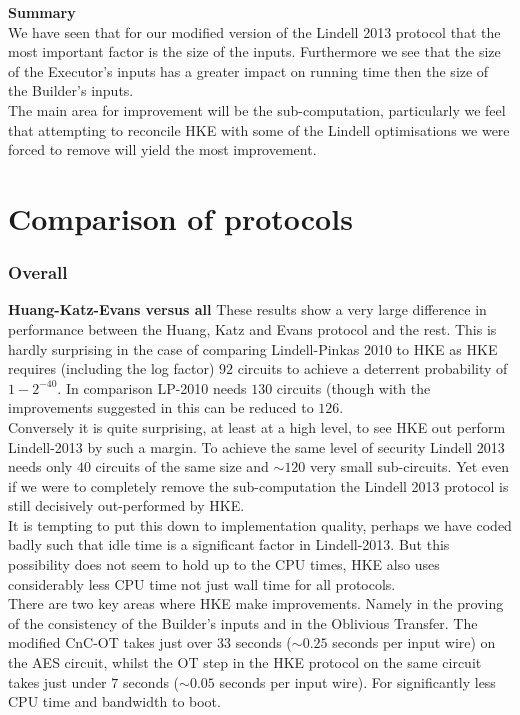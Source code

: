 \documentclass[ %
                    author={Nicholas Tutte},
                supervisor={Prof. Nigel Smart},
                    degree={MEng},
                     title={Secure Two Party Computation},
                  subtitle={A practical comparison of recent protocols},
                      type={Research - GG1K},
                      year={2015} ]{dissertation}
\begin{document}
				\noindent \textbf{Summary}\\
					We have seen that for our modified version of the Lindell 2013 protocol that the most important factor is the size of the inputs. Furthermore we see that the size of the Executor's inputs has a greater impact on running time then the size of the Builder's inputs.\\

					The main area for improvement will be the sub-computation, particularly we feel that attempting to reconcile HKE with some of the Lindell optimisations we were forced to remove will yield the most improvement.

			\FloatBarrier
			\section{Comparison of protocols}
				\subsubsection{Overall}

					\noindent \textbf{Huang-Katz-Evans versus all} These results show a very large difference in performance between the Huang, Katz and Evans protocol and the rest. This is hardly surprising in the case of comparing Lindell-Pinkas 2010 to HKE as HKE requires (including the log factor) $92$ circuits to achieve a deterrent probability of $1 - 2^{-40}$. In comparison LP-2010 needs $130$ circuits (though with the improvements suggested in \cite{ShelatAndShen} this can be reduced to $126$.\\

					Conversely it is quite surprising, at least at a high level, to see HKE out perform Lindell-2013 by such a margin. To achieve the same level of security Lindell 2013 needs only $40$ circuits of the same size and $\sim 120$ very small sub-circuits. Yet even if we were to completely remove the sub-computation the Lindell 2013 protocol is still decisively out-performed by HKE.\\

					It is tempting to put this down to implementation quality, perhaps we have coded badly such that idle time is a significant factor in Lindell-2013. But this possibility does not seem to hold up to the CPU times, HKE also uses considerably less CPU time not just wall time for all protocols.\\

					There are two key areas where HKE make improvements. Namely in the proving of the consistency of the Builder's inputs and in the Oblivious Transfer. The modified CnC-OT takes just over $33$ seconds ($\sim 0.25$ seconds per input wire) on the AES circuit, whilst the OT step in the HKE protocol on the same circuit takes just under $7$ seconds ($\sim 0.05$ seconds per input wire). For significantly less CPU time and bandwidth to boot.\\
\end{document}
